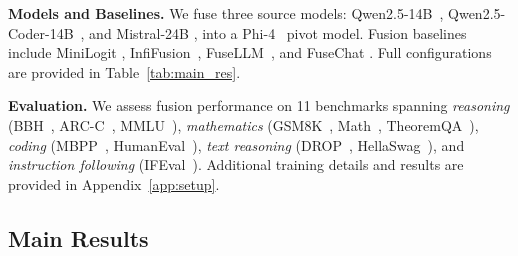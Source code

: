 \documentclass{article}
\begin{document}
\textbf{Models and Baselines.}
We fuse three source models: Qwen2.5-14B~\cite{yang2024qwen2}, Qwen2.5-Coder-14B~\cite{yang2024qwen2}, and Mistral-24B \cite{Mistral24B}, into a Phi-4~\cite{abdin2024phi} pivot model. Fusion baselines include MiniLogit \cite{guo2020online}, InfiFusion~\cite{yan2025infifusion}, FuseLLM~\cite{wanknowledge}, and FuseChat \cite{wan2024fusechat}. Full configurations are provided in Table~\ref{tab:main_res}.

\textbf{Evaluation.}
We assess fusion performance on 11 benchmarks spanning \textit{reasoning} (BBH~\cite{suzgun2023challenging}, ARC-C~\cite{yadav2019quick}, MMLU~\cite{hendrycksmeasuring}), \textit{mathematics} (GSM8K~\cite{cobbe2021training}, Math~\cite{hendrycks2measuring}, TheoremQA~\cite{chen2023theoremqa}), \textit{coding} (MBPP~\cite{austin2021program}, HumanEval~\cite{chen2021evaluating}), \textit{text reasoning} (DROP~\cite{dua2019drop}, HellaSwag~\cite{zellers2019hellaswag}), and \textit{instruction following} (IFEval~\cite{zhou2023instruction}).
%
Additional training details and results are provided in Appendix~\ref{app:setup}.



\subsection{Main Results}
\end{document}
